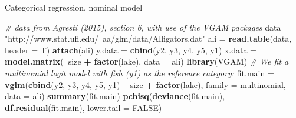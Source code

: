 \documentclass[ignorenonframetext,]{beamer}
\newenvironment{Shaded}{\begin{snugshade}}{\end{snugshade}}
\newcommand{\KeywordTok}[1]{\textcolor[rgb]{0.13,0.29,0.53}{\textbf{#1}}}
\newcommand{\DataTypeTok}[1]{\textcolor[rgb]{0.13,0.29,0.53}{#1}}
\newcommand{\StringTok}[1]{\textcolor[rgb]{0.31,0.60,0.02}{#1}}
\newcommand{\CommentTok}[1]{\textcolor[rgb]{0.56,0.35,0.01}{\textit{#1}}}
\newcommand{\OtherTok}[1]{\textcolor[rgb]{0.56,0.35,0.01}{#1}}
\newcommand{\OperatorTok}[1]{\textcolor[rgb]{0.81,0.36,0.00}{\textbf{#1}}}
\newcommand{\NormalTok}[1]{#1}
\begin{document}
\begin{frame}[fragile]

\begin{block}{Categorical regression, nominal model}

\begin{Shaded}
\begin{Highlighting}[]
\CommentTok{# data from Agresti (2015), section 6, with use of the VGAM packages}
\NormalTok{data =}\StringTok{ "http://www.stat.ufl.edu/~aa/glm/data/Alligators.dat"}
\NormalTok{ali =}\StringTok{ }\KeywordTok{read.table}\NormalTok{(data, }\DataTypeTok{header =}\NormalTok{ T)}
\KeywordTok{attach}\NormalTok{(ali)}
\NormalTok{y.data =}\StringTok{ }\KeywordTok{cbind}\NormalTok{(y2, y3, y4, y5, y1)}
\NormalTok{x.data =}\StringTok{ }\KeywordTok{model.matrix}\NormalTok{(}\OperatorTok{~}\NormalTok{size }\OperatorTok{+}\StringTok{ }\KeywordTok{factor}\NormalTok{(lake), }\DataTypeTok{data =}\NormalTok{ ali)}
\KeywordTok{library}\NormalTok{(VGAM)}
\CommentTok{# We fit a multinomial logit model with fish (y1) as the reference category:}
\NormalTok{fit.main =}\StringTok{ }\KeywordTok{vglm}\NormalTok{(}\KeywordTok{cbind}\NormalTok{(y2, y3, y4, y5, y1) }\OperatorTok{~}\StringTok{ }\NormalTok{size }\OperatorTok{+}\StringTok{ }\KeywordTok{factor}\NormalTok{(lake), }\DataTypeTok{family =}\NormalTok{ multinomial, }
    \DataTypeTok{data =}\NormalTok{ ali)}
\KeywordTok{summary}\NormalTok{(fit.main)}
\KeywordTok{pchisq}\NormalTok{(}\KeywordTok{deviance}\NormalTok{(fit.main), }\KeywordTok{df.residual}\NormalTok{(fit.main), }\DataTypeTok{lower.tail =} \OtherTok{FALSE}\NormalTok{)}
\end{Highlighting}
\end{Shaded}


\end{block}
\end{frame}
\end{document}
